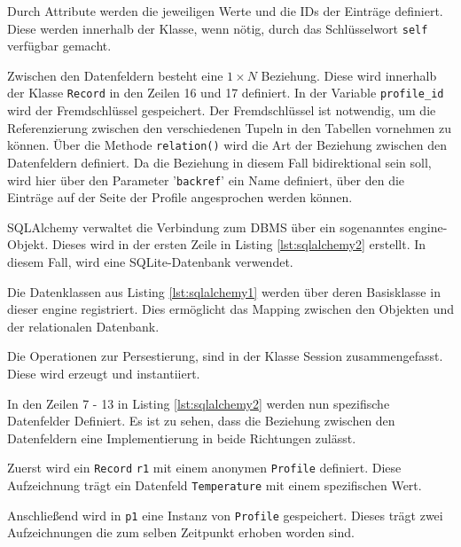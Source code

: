     Durch Attribute werden die jeweiligen Werte und die IDs der Einträge definiert.  Diese werden innerhalb der Klasse, wenn nötig, durch das Schlüsselwort \texttt{self} verfügbar gemacht.                                                                                                                                                                                                                                

    Zwischen den Datenfeldern besteht eine $1 \times N$ Beziehung. Diese wird innerhalb der Klasse \texttt{Record} in den Zeilen 16 und 17 definiert.  In der Variable \texttt{profile\_id} wird der Fremdschlüssel gespeichert. Der Fremdschlüssel ist notwendig, um die Referenzierung zwischen den verschiedenen Tupeln in den Tabellen vornehmen zu können. Über die Methode \texttt{relation()} wird die Art der Beziehung zwischen den Datenfeldern definiert. Da die Beziehung in diesem Fall bidirektional sein soll, wird hier über den Parameter '\texttt{backref}' ein Name definiert, über den die Einträge auf der Seite der Profile angesprochen werden können.
    
    
        
    SQLAlchemy verwaltet die Verbindung zum DBMS über ein sogenanntes engine-Objekt. Dieses wird in der ersten Zeile in Listing \ref{lst:sqlalchemy2} erstellt. In diesem Fall, wird eine SQLite-Datenbank verwendet.
    
    Die Datenklassen aus Listing \ref{lst:sqlalchemy1} werden über deren Basisklasse in dieser engine registriert. Dies ermöglicht das Mapping zwischen den Objekten und der relationalen Datenbank.
    
    Die Operationen zur Persestierung, sind in der Klasse Session zusammengefasst. Diese wird erzeugt und instantiiert. 
    
    In den Zeilen 7 - 13 in Listing \ref{lst:sqlalchemy2} werden nun spezifische Datenfelder Definiert. Es ist zu sehen, dass die Beziehung zwischen den Datenfeldern eine Implementierung in beide Richtungen zulässt.
    
    Zuerst wird ein \texttt{Record} \texttt{r1} mit einem anonymen \texttt{Profile} definiert. Diese Aufzeichnung trägt ein Datenfeld \texttt{Temperature} mit einem spezifischen Wert.
    
    Anschließend wird in \texttt{p1} eine Instanz von \texttt{Profile} gespeichert. Dieses trägt zwei Aufzeichnungen die zum selben Zeitpunkt erhoben worden sind.
    \\
    
